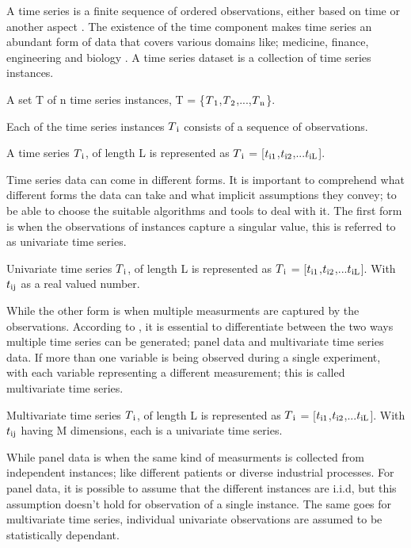 A time series is a finite sequence of ordered observations, either based on time or another aspect \cite{abanda2019review,bagnall2017great}.
The existence of the time component makes time series an abundant form of data that covers various domains like; medicine, finance, engineering and biology \cite{lines2018time}.
A time series dataset is a collection of time series instances.
\begin{definition}
A set T of n time series instances, T = \{$T\textsubscript{1}$,$T\textsubscript{2}$,...,$T\textsubscript{n}$\}.
\end{definition}
Each of the time series instances $T\textsubscript{i}$ consists of a sequence of observations.
\begin{definition}
A time series $T\textsubscript{i}$, of length L is represented as $T\textsubscript{i}$ = [$t\textsubscript{i1}$,$t\textsubscript{i2}$,...$t\textsubscript{iL}$].
\end{definition}
Time series data can come in different forms. It is important to comprehend what different forms the data can take and what implicit assumptions they convey; to be able to choose the suitable algorithms and tools to deal with it.\newline
The first form is when the observations of instances capture a singular value, this is referred to as univariate time series.
\begin{definition}
Univariate time series $T\textsubscript{i}$, of length L is represented as $T\textsubscript{i}$ = [$t\textsubscript{i1}$,$t\textsubscript{i2}$,...$t\textsubscript{iL}$]. With $t\textsubscript{ij}$ as a real valued number.
\end{definition}
While the other form is when multiple measurments are captured by the observations.
According to \cite{loning2019sktime}, it is essential to differentiate between the two ways multiple time series can be generated; panel data and multivariate time series data.\newline
If more than one variable is being observed during a single experiment, with each variable representing a different measurement; this is called multivariate time series.
\begin{definition}
Multivariate time series $T\textsubscript{i}$, of length L is represented as $T\textsubscript{i}$ = [$t\textsubscript{i1}$,$t\textsubscript{i2}$,...$t\textsubscript{iL}$]. With $t\textsubscript{ij}$ having M dimensions, each is a univariate time series.
\end{definition}
While panel data is when the same kind of measurments is collected from independent instances; like different patients or diverse industrial processes.\newline
For panel data, it is possible to assume that the different instances are i.i.d, but this assumption doesn't hold for observation of a single instance.
The same goes for multivariate time series, individual univariate observations are assumed to be statistically dependant.